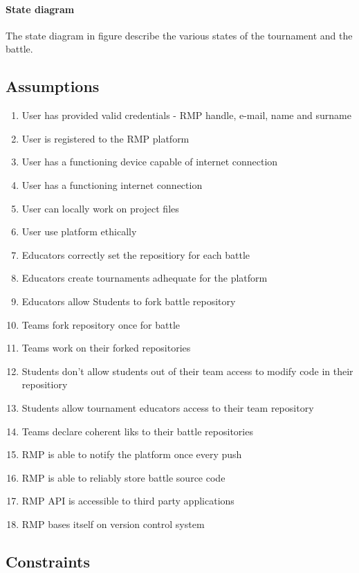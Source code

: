 \paragraph{State diagram}
The state diagram in figure describe the various states of the tournament and the battle.

\subsection{Assumptions}
\begin{enumerate}[label=$\bullet$ \textbf{D\arabic*:}]
    \item User has provided valid credentials - RMP handle, e-mail, name and surname
    \item User is registered to the RMP platform
    \item User has a functioning device capable of internet connection
    \item User has a functioning internet connection
    \item User can locally work on project files
    \item User use platform ethically
    \item Educators correctly set the repositiory for each battle
    \item Educators create tournaments adhequate for the platform
    \item Educators allow Students to fork battle repository
    \item Teams fork repository once for battle
    \item Teams work on their forked repositories
    \item Students don't allow students out of their team access to modify code in their repositiory
    \item Students allow tournament educators access to their team repository
    \item Teams declare coherent liks to their battle repositories
    \item RMP is able to notify the platform once every push
    \item RMP is able to reliably store battle source code
    \item RMP API is accessible to third party applications
    \item RMP bases itself on version control system
\end{enumerate}
\subsection{Constraints}
